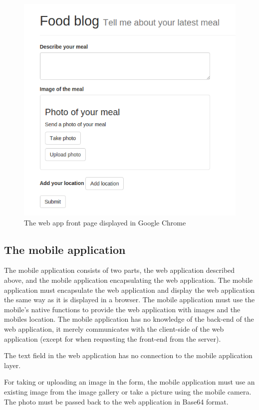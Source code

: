 \begin{figure}[h!]
	\centering
    \includegraphics[width=120mm,natwidth=800,natheight=600]{./img/webAppFrontPage.png}
    \caption{The web app front page displayed in Google Chrome}
    \label{fig:webappfront}
\end{figure}

\subsection{The mobile application} \label{subsec:the-mobile-application}
The mobile application consists of two parts, the web application described above, and the mobile application encapsulating the web application. The mobile application must encapsulate the web application and display the web application the same way as it is displayed in a browser. The mobile application must use the mobile’s native functions to provide the web application with images and the mobiles location. The mobile application has no knowledge of the back-end of the web application, it merely communicates with the client-side of the web application (except for when requesting the front-end from the server).

The text field in the web application has no connection to the mobile application layer. 

For taking or uploading an image in the form, the mobile application must use an existing image from the image gallery or take a picture using the mobile camera. The photo must be passed back to the web application in Base64 format. 

